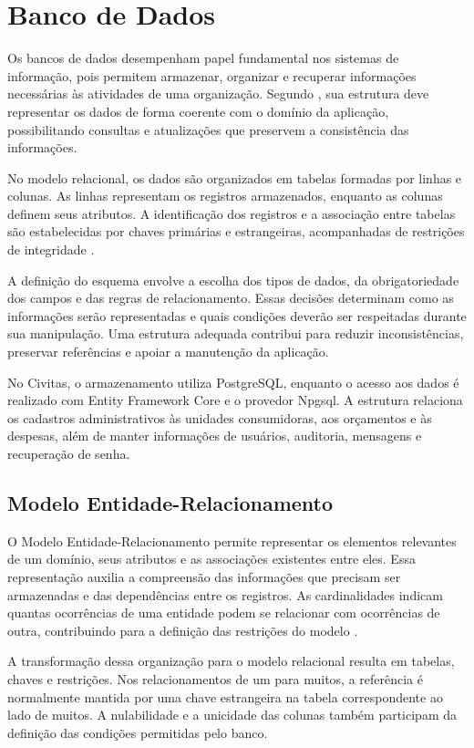 \chapter{Banco de Dados}

Os bancos de dados desempenham papel fundamental nos sistemas de informação, pois permitem armazenar, organizar e recuperar informações necessárias às atividades de uma organização. Segundo \textcite{Machado2020}, sua estrutura deve representar os dados de forma coerente com o domínio da aplicação, possibilitando consultas e atualizações que preservem a consistência das informações.

No modelo relacional, os dados são organizados em tabelas formadas por linhas e colunas. As linhas representam os registros armazenados, enquanto as colunas definem seus atributos. A identificação dos registros e a associação entre tabelas são estabelecidas por chaves primárias e estrangeiras, acompanhadas de restrições de integridade \parencite{Silberschatz2012}.

A definição do esquema envolve a escolha dos tipos de dados, da obrigatoriedade dos campos e das regras de relacionamento. Essas decisões determinam como as informações serão representadas e quais condições deverão ser respeitadas durante sua manipulação. Uma estrutura adequada contribui para reduzir inconsistências, preservar referências e apoiar a manutenção da aplicação.

No Civitas, o armazenamento utiliza PostgreSQL, enquanto o acesso aos dados é realizado com Entity Framework Core e o provedor Npgsql. A estrutura relaciona os cadastros administrativos às unidades consumidoras, aos orçamentos e às despesas, além de manter informações de usuários, auditoria, mensagens e recuperação de senha.

\section{Modelo Entidade-Relacionamento}

O Modelo Entidade-Relacionamento permite representar os elementos relevantes de um domínio, seus atributos e as associações existentes entre eles. Essa representação auxilia a compreensão das informações que precisam ser armazenadas e das dependências entre os registros. As cardinalidades indicam quantas ocorrências de uma entidade podem se relacionar com ocorrências de outra, contribuindo para a definição das restrições do modelo \parencite{Silberschatz2012}.

A transformação dessa organização para o modelo relacional resulta em tabelas, chaves e restrições. Nos relacionamentos de um para muitos, a referência é normalmente mantida por uma chave estrangeira na tabela correspondente ao lado de muitos. A nulabilidade e a unicidade das colunas também participam da definição das condições permitidas pelo banco.

